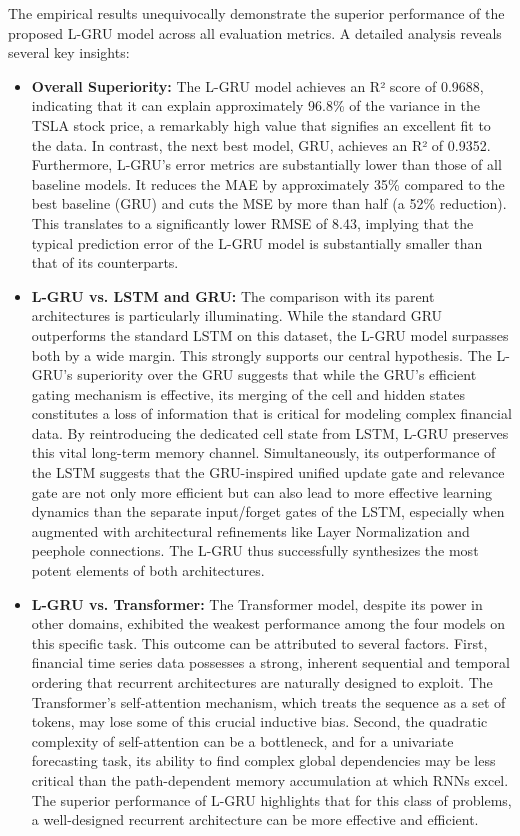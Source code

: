 \documentclass{cys}
\begin{document}
\begin{enumerate}
    The empirical results unequivocally demonstrate the superior performance of the proposed L-GRU model across all evaluation metrics. A detailed analysis reveals several key insights:
    \begin{itemize}
        \item \textbf{Overall Superiority:}
        The L-GRU model achieves an R² score of 0.9688, indicating that it can explain approximately 96.8\% of the variance in the TSLA stock price, a remarkably high value that signifies an excellent fit to the data. In contrast, the next best model, GRU, achieves an R² of 0.9352. Furthermore, L-GRU's error metrics are substantially lower than those of all baseline models. It reduces the MAE by approximately 35\% compared to the best baseline (GRU) and cuts the MSE by more than half (a 52\% reduction). This translates to a significantly lower RMSE of 8.43, implying that the typical prediction error of the L-GRU model is substantially smaller than that of its counterparts.
        \item \textbf{L-GRU vs. LSTM and GRU:}
        The comparison with its parent architectures is particularly illuminating. While the standard GRU outperforms the standard LSTM on this dataset, the L-GRU model surpasses both by a wide margin. This strongly supports our central hypothesis. The L-GRU's superiority over the GRU suggests that while the GRU's efficient gating mechanism is effective, its merging of the cell and hidden states constitutes a loss of information that is critical for modeling complex financial data. By reintroducing the dedicated cell state from LSTM, L-GRU preserves this vital long-term memory channel. Simultaneously, its outperformance of the LSTM suggests that the GRU-inspired unified update gate and relevance gate are not only more efficient but can also lead to more effective learning dynamics than the separate input/forget gates of the LSTM, especially when augmented with architectural refinements like Layer Normalization and peephole connections. The L-GRU thus successfully synthesizes the most potent elements of both architectures.
        \item \textbf{L-GRU vs. Transformer:}
        The Transformer model, despite its power in other domains, exhibited the weakest performance among the four models on this specific task. This outcome can be attributed to several factors. First, financial time series data possesses a strong, inherent sequential and temporal ordering that recurrent architectures are naturally designed to exploit. The Transformer's self-attention mechanism, which treats the sequence as a set of tokens, may lose some of this crucial inductive bias. Second, the quadratic complexity of self-attention can be a bottleneck, and for a univariate forecasting task, its ability to find complex global dependencies may be less critical than the path-dependent memory accumulation at which RNNs excel. The superior performance of L-GRU highlights that for this class of problems, a well-designed recurrent architecture can be more effective and efficient.

\end{itemize}
\end{enumerate}
\end{document}
